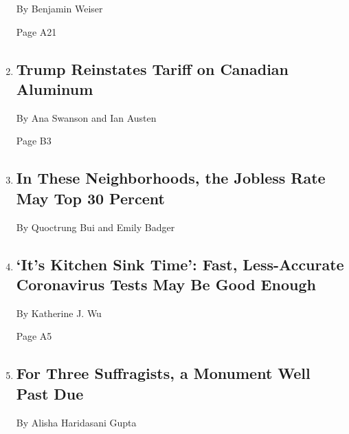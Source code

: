 \begin{enumerate}
  By Benjamin Weiser

  Page A21
\item
  \href{/2020/08/06/business/economy/trump-canadian-aluminum-tariffs.html}{}

  \hypertarget{trump-reinstates-tariff-on-canadian-aluminum}{%
  \subsection{Trump Reinstates Tariff on Canadian
  Aluminum}\label{trump-reinstates-tariff-on-canadian-aluminum}}

  By Ana Swanson and Ian Austen

  Page B3
\item
  \href{/interactive/2020/08/05/upshot/us-unemployment-maps-coronavirus.html}{}

  \hypertarget{in-these-neighborhoods-the-jobless-rate-may-top-30-percent}{%
  \subsection{In These Neighborhoods, the Jobless Rate May Top 30
  Percent}\label{in-these-neighborhoods-the-jobless-rate-may-top-30-percent}}

  By Quoctrung Bui and Emily Badger
\item
  \href{/2020/08/06/health/rapid-Covid-tests.html}{}

  \hypertarget{its-kitchen-sink-time-fast-less-accurate-coronavirus-tests-may-be-good-enough}{%
  \subsection{`It's Kitchen Sink Time': Fast, Less-Accurate Coronavirus
  Tests May Be Good
  Enough}\label{its-kitchen-sink-time-fast-less-accurate-coronavirus-tests-may-be-good-enough}}

  By Katherine J. Wu

  Page A5
\item
  \href{/2020/08/06/arts/design/suffragist-19th-amendment-central-park.html}{}

  \hypertarget{for-three-suffragists-a-monument-well-past-due}{%
  \subsection{For Three Suffragists, a Monument Well Past
  Due}\label{for-three-suffragists-a-monument-well-past-due}}

  By Alisha Haridasani Gupta


\end{enumerate}
